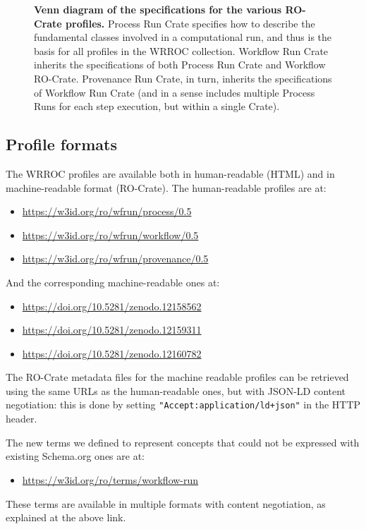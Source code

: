 \begin{figure}[htb]
  \caption{{\bf Venn diagram of the specifications for the various RO-Crate profiles.}
  Process Run Crate specifies how to describe the fundamental classes involved in a computational run, and thus is the basis for all profiles in the WRROC collection.
  Workflow Run Crate inherits the specifications of both Process Run Crate and Workflow RO-Crate. Provenance Run Crate, in turn, inherits the specifications of Workflow Run Crate (and in a sense includes multiple Process Runs for each step execution, but within a single Crate).
  }
  \label{fig:wrroc:profile_venn}
  \end{figure}


\subsection{Profile formats}\label{wrroc:profile-formats}

The WRROC profiles are available both in human-readable (HTML) and in machine-readable format (RO-Crate). The human-readable profiles are at:
%
\begin{itemize}
    \item \url{https://w3id.org/ro/wfrun/process/0.5}
    \item \url{https://w3id.org/ro/wfrun/workflow/0.5}
    \item \url{https://w3id.org/ro/wfrun/provenance/0.5}
\end{itemize}
%
And the corresponding machine-readable ones at:
%
\begin{itemize}
    \item \url{https://doi.org/10.5281/zenodo.12158562}
    \item \url{https://doi.org/10.5281/zenodo.12159311}
    \item \url{https://doi.org/10.5281/zenodo.12160782}
\end{itemize}
%
The RO-Crate metadata files for the machine readable profiles can be retrieved using the same URLs as the human-readable ones, but with JSON-LD content negotiation: this is done by setting \texttt{"Accept:application/ld+json"} in the HTTP header.

The new terms we defined to represent concepts that could not be expressed with existing Schema.org ones are at:
%
\begin{itemize}
    \item \url{https://w3id.org/ro/terms/workflow-run}
\end{itemize}
%
These terms are available in multiple formats with content negotiation, as explained at the above link.

